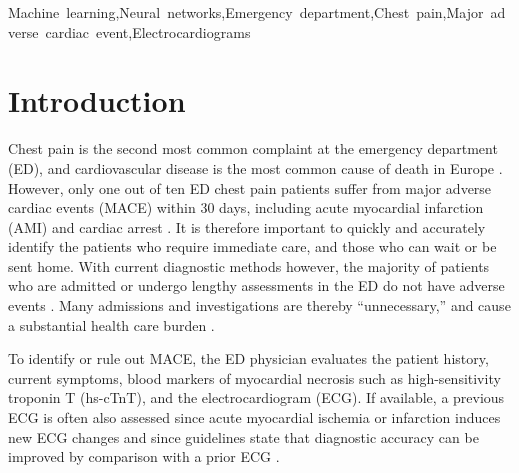 \documentclass[preprint]{elsarticle}
\begin{document}
\begin{frontmatter}
\begin{keyword}
Machine~learning\sep Neural~networks\sep Emergency~department\sep Chest~pain\sep Major~adverse~cardiac~event\sep Electrocardiograms
\end{keyword}

\end{frontmatter}



\section{Introduction}
\label{sec:introduction}
Chest pain is the second most common complaint at the emergency department (ED), and cardiovascular disease is the most common cause of death in Europe \citep{timmis2022}. However, only one out of ten ED chest pain patients suffer from major adverse cardiac events (MACE) within 30 days, including acute myocardial infarction (AMI) and cardiac arrest \citep{mokhtari2016}. It is therefore important to quickly and accurately identify the patients who require immediate care, and those who can wait or be sent home. With current diagnostic methods however, the majority of patients who are admitted or undergo lengthy assessments in the ED do not have adverse events \citep{christenson2004,pollack2006}. Many admissions and investigations are thereby ``unnecessary,'' and cause a substantial health care burden \citep{cullen2015}.

To identify or rule out MACE, the ED physician evaluates the patient history, current symptoms, blood markers of myocardial necrosis such as high-sensitivity troponin T (hs-cTnT), and the electrocardiogram (ECG). If available, a previous ECG is often also assessed since acute myocardial ischemia or infarction induces new ECG changes and since guidelines state that diagnostic accuracy can be improved by comparison with a prior ECG \citep{anderson2013,lee1990}.

\end{document}
